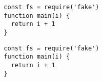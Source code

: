 \documentclass{article}
\begin{document}
\begin{verbatim}
  const fs = require('fake')
  function main(i) {
    return i + 1
  }
\end{verbatim}

\begin{verbatim}
  const fs = require('fake')
  function main(i) {
    return i + 1
  }
\end{verbatim}
\end{document}
